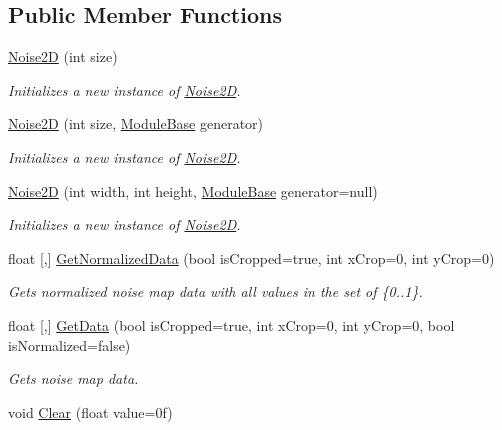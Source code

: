 \subsection*{Public Member Functions}
\begin{DoxyCompactItemize}
\item 
\hyperlink{class_lib_noise_1_1_noise2_d_a8729ca7498a796e7c46317e3d40bdfa8}{Noise2D} (int size)
\begin{DoxyCompactList}\small\item\em Initializes a new instance of \hyperlink{class_lib_noise_1_1_noise2_d}{Noise2D}. \end{DoxyCompactList}\item 
\hyperlink{class_lib_noise_1_1_noise2_d_a4f2c693c60b8327c5c906f137293a8c2}{Noise2D} (int size, \hyperlink{class_lib_noise_1_1_module_base}{Module\+Base} generator)
\begin{DoxyCompactList}\small\item\em Initializes a new instance of \hyperlink{class_lib_noise_1_1_noise2_d}{Noise2D}. \end{DoxyCompactList}\item 
\hyperlink{class_lib_noise_1_1_noise2_d_a89d44465cd842be3f3a8b31e78f43072}{Noise2D} (int width, int height, \hyperlink{class_lib_noise_1_1_module_base}{Module\+Base} generator=null)
\begin{DoxyCompactList}\small\item\em Initializes a new instance of \hyperlink{class_lib_noise_1_1_noise2_d}{Noise2D}. \end{DoxyCompactList}\item 
float \mbox{[},\mbox{]} \hyperlink{class_lib_noise_1_1_noise2_d_a867fe1a88b54558bead78d9afdc0910e}{Get\+Normalized\+Data} (bool is\+Cropped=true, int x\+Crop=0, int y\+Crop=0)
\begin{DoxyCompactList}\small\item\em Gets normalized noise map data with all values in the set of \{0..1\}. \end{DoxyCompactList}\item 
float \mbox{[},\mbox{]} \hyperlink{class_lib_noise_1_1_noise2_d_ab2df7d84610548485750ada563a21afe}{Get\+Data} (bool is\+Cropped=true, int x\+Crop=0, int y\+Crop=0, bool is\+Normalized=false)
\begin{DoxyCompactList}\small\item\em Gets noise map data. \end{DoxyCompactList}\item 
void \hyperlink{class_lib_noise_1_1_noise2_d_abac1753aea45f939e42cdd236ed9b2de}{Clear} (float value=0f)

\end{DoxyCompactItemize}
